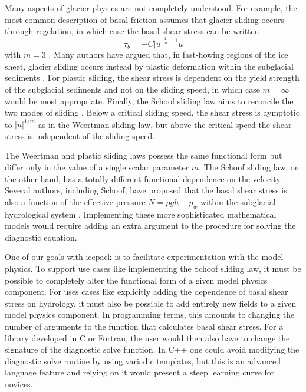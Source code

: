 \documentclass{article}
\theoremstyle{definition}
\theoremstyle{plain}
\begin{document}
Many aspects of glacier physics are not completely understood.
For example, the most common description of basal friction assumes that glacier sliding occurs through regelation, in which case the basal shear stress can be written
\begin{equation}
    \tau_b = -C|u|^{\frac{1}{m} - 1}u
    \label{eq:weertman-sliding}
\end{equation}
with $m = 3$ \citep{weertman1957sliding}.
Many authors have argued that, in fast-flowing regions of the ice sheet, glacier sliding occurs instead by plastic deformation within the subglacial sediments \citep{tulaczyk2000basal}.
For plastic sliding, the shear stress is dependent on the yield strength of the subglacial sediments and not on the sliding speed, in which case $m = \infty$ would be most appropriate.
Finally, the Schoof sliding law aims to reconcile the two modes of sliding \citep{schoof2005effect}.
Below a critical sliding speed, the shear stress is aymptotic to $|u|^{1/m}$ as in the Weertman sliding law, but above the critical speed the shear stress is independent of the sliding speed.

The Weertman and plastic sliding laws possess the same functional form but differ only in the value of a single scalar parameter $m$.
The Schoof sliding law, on the other hand, has a totally different functional dependence on the velocity.
Several authors, including Schoof, have proposed that the basal shear stress is also a function of the effective pressure $N = \rho gh - p_w$ within the subglacial hydrological system \citep{budd1979empirical, schoof2005effect}.
Implementing these more sophisticated mathematical models would require adding an extra argument to the procedure for solving the diagnostic equation.

One of our goals with icepack is to facilitate experimentation with the model physics.
To support use cases like implementing the Schoof sliding law, it must be possible to completely alter the functional form of a given model physics component.
For uses cases like explicitly adding the dependence of basal shear stress on hydrology, it must also be possible to add entirely new fields to a given model physics component.
In programming terms, this amounts to changing the number of arguments to the function that calculates basal shear stress.
For a library developed in C or Fortran, the user would then also have to change the signature of the diagnostic solve function.
In C++ one could avoid modifying the diagnostic solve routine by using variadic templates, but this is an advanced language feature and relying on it would present a steep learning curve for novices.
\end{document}
